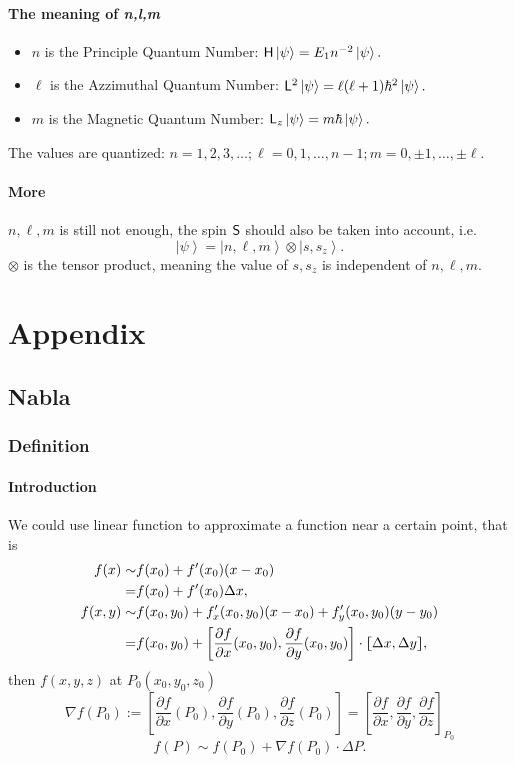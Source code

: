 \documentclass{article}
\newcommand{\ko}[1]{\hspace{-#1 pt}}%
\newcommand{\pd}[2]{\frac{\partial #1}{\partial #2}}%
\newcommand{\ket}[1]{\left\vert #1\right\rangle}
\newcommand{\cmm}[1]{\lfloor\ko{4.45}\lceil #1\rceil\ko{4.45}\rfloor}%
\begin{document}
\paragraph{The meaning of \textit{n,l,m}}
\begin{itemize}
	\item $n$ is the Principle Quantum Number: $\sH\ket\psi=E_1n^{-2}\ket\psi.$
	\item $\ell$ is the Azzimuthal Quantum Number: $\sL^2\ket\psi=\ell(\ell+1)\hbar^2\ket\psi.$
	\item $m$ is the Magnetic Quantum Number: $\sL_z\ket\psi=m\hbar\ket\psi.$
\end{itemize}
The values are quantized: $n=1,2,3,\ldots;\ell=0,1,\ldots,n-1;m=0,\pm 1,\ldots,\pm\ell$.
\paragraph{More} $n,\ell,m$ is still not enough, the spin $\mathsf S$ should also be taken into account, i.e.
$$\ket\psi=\ket{n,\ell,m}\otimes\ket{s,s_z}.$$
$\otimes$ is the tensor product, meaning the value of $s,s_z$ is independent of $n,\ell,m$.
\section{Appendix}
\subsection{Nabla}
\subsubsection{Definition}
\paragraph{Introduction}We could use linear function to approximate a function near a certain point, that is
\begin{align*}
	f(x)\sim   & f(x_0)+f'(x_0)(x-x_0)                                                                \\
	=          & f(x_0)+f'(x_0)\Delta x,                                                              \\
	f(x,y)\sim & f(x_0,y_0)+f'_x(x_0,y_0)(x-x_0)+f'_y(x_0,y_0)(y-y_0)                                 \\
	=          & f(x_0,y_0)+\left[\pd fx(x_0,y_0),\pd fy(x_0,y_0)\right]\cdot\cmm{\Delta x,\Delta y},
\end{align*}
then $f(x,y,z)$ at $P_0(x_0,y_0,z_0)$
$$\nabla f(P_0):=\left[\pd fx(P_0),\pd fy(P_0),\pd fz(P_0)\right]=\left[\pd fx,\pd fy,\pd fz\right]_{P_0}$$
$$f(P)\sim f(P_0)+\nabla f(P_0)\cdot\Delta P.$$
\end{document}
